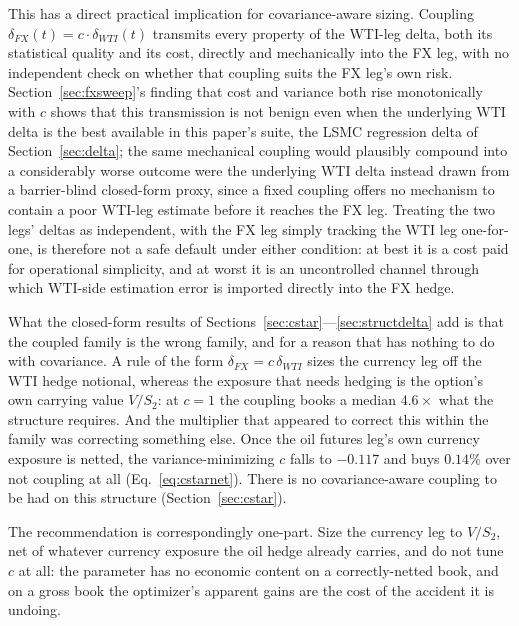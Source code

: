 \documentclass[11pt,a4paper]{article}
\begin{document}
This has a direct practical implication for covariance-aware sizing. Coupling $\delta_{FX}(t)=c\cdot\delta_{WTI}(t)$ transmits every property of the WTI-leg delta, both its statistical quality and its cost, directly and mechanically into the FX leg, with no independent check on whether that coupling suits the FX leg's own risk. Section~\ref{sec:fxsweep}'s finding that cost and variance both rise monotonically with $c$ shows that this transmission is not benign even when the underlying WTI delta is the best available in this paper's suite, the LSMC regression delta of Section~\ref{sec:delta}; the same mechanical coupling would plausibly compound into a considerably worse outcome were the underlying WTI delta instead drawn from a barrier-blind closed-form proxy, since a fixed coupling offers no mechanism to contain a poor WTI-leg estimate before it reaches the FX leg. Treating the two legs' deltas as independent, with the FX leg simply tracking the WTI leg one-for-one, is therefore not a safe default under either condition: at best it is a cost paid for operational simplicity, and at worst it is an uncontrolled channel through which WTI-side estimation error is imported directly into the FX hedge.

What the closed-form results of Sections~\ref{sec:cstar}---\ref{sec:structdelta} add is that the coupled family is the wrong family, and for a reason that has nothing to do with covariance. A rule of the form $\delta_{FX}=c\,\delta_{WTI}$ sizes the currency leg off the WTI hedge notional, whereas the exposure that needs hedging is the option's own carrying value $V/S_2$: at $c=1$ the coupling books a median $4.6\times$ what the structure requires. And the multiplier that appeared to correct this within the family was correcting something else. Once the oil futures leg's own currency exposure is netted, the variance-minimizing $c$ falls to $-0.117$ and buys $0.14\%$ over not coupling at all (Eq.~\ref{eq:cstarnet}). There is no covariance-aware coupling to be had on this structure (Section~\ref{sec:cstar}).

The recommendation is correspondingly one-part. Size the currency leg to $V/S_2$, net of whatever currency exposure the oil hedge already carries, and do not tune $c$ at all: the parameter has no economic content on a correctly-netted book, and on a gross book the optimizer's apparent gains are the cost of the accident it is undoing.
\end{document}

